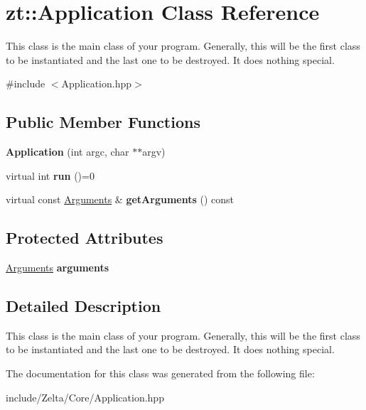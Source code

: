 \hypertarget{classzt_1_1_application}{}\section{zt\+:\+:Application Class Reference}
\label{classzt_1_1_application}


This class is the main class of your program. Generally, this will be the first class to be instantiated and the last one to be destroyed. It does nothing special.  




{\ttfamily \#include $<$Application.\+hpp$>$}

\subsection*{Public Member Functions}
\begin{DoxyCompactItemize}
\item 
\mbox{\label{classzt_1_1_application_afa0cd6ed2803717f73d602863f669c40}} 
{\bfseries Application} (int argc, char $\ast$$\ast$argv)
\item 
\mbox{\label{classzt_1_1_application_a90a277ed91c864c953c1c20843b765af}} 
virtual int {\bfseries run} ()=0
\item 
\mbox{\label{classzt_1_1_application_a8c1357f7819e739d8c7e88712eab18da}} 
virtual const \hyperlink{classzt_1_1_arguments}{Arguments} \& {\bfseries get\+Arguments} () const
\end{DoxyCompactItemize}
\subsection*{Protected Attributes}
\begin{DoxyCompactItemize}
\item 
\mbox{\label{classzt_1_1_application_a0ccbf0d4c1aec8b3bc99430e948a8f5b}} 
\hyperlink{classzt_1_1_arguments}{Arguments} {\bfseries arguments}
\end{DoxyCompactItemize}


\subsection{Detailed Description}
This class is the main class of your program. Generally, this will be the first class to be instantiated and the last one to be destroyed. It does nothing special. 

The documentation for this class was generated from the following file\+:\begin{DoxyCompactItemize}
\item 
include/\+Zelta/\+Core/Application.\+hpp\end{DoxyCompactItemize}
